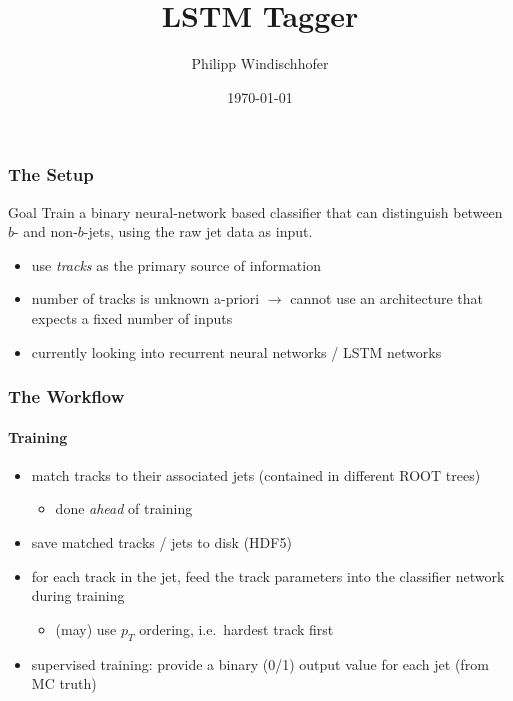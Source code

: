 \documentclass{beamer}
\title{LSTM Tagger}
\author{Philipp Windischhofer}
\date{\today}
\begin{document}
 
\frame{\titlepage}


\begin{frame}
  \frametitle{The Setup}

  \begin{block}{Goal}
    Train a binary neural-network based classifier that can distinguish between $b$- and non-$b$-jets, using the raw jet data as input.
  \end{block}

  \begin{itemize}
  \item use \textsl{tracks} as the primary source of information
  \item number of tracks is unknown a-priori $\rightarrow$ cannot use an architecture that expects a fixed number of inputs
  \item currently looking into recurrent neural networks / LSTM networks
  \end{itemize}
\end{frame}

\begin{frame}
  \frametitle{The Workflow}
  \framesubtitle{Training}
  \begin{itemize}
  \item match tracks to their associated jets (contained in different ROOT trees)
    \begin{itemize}
      \item done \textsl{ahead} of training
    \end{itemize}
  \item save matched tracks / jets to disk (HDF5)
  \item for each track in the jet, feed the track parameters into the classifier network during training
    \begin{itemize}
      \item (may) use $p_T$ ordering, i.e.~hardest track first
    \end{itemize}
  \item supervised training: provide a binary (0/1) output value for each jet (from MC truth)
  \end{itemize}

\end{frame}
\end{document}
